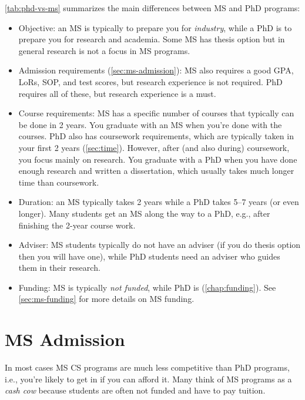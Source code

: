 \documentclass[oneside,11pt]{book}
\begin{document}
\autoref{tab:phd-vs-ms} summarizes the main differences between MS and PhD programs:
\begin{itemize}

  \item Objective: an MS is typically to prepare you for \emph{industry}, while a PhD is to prepare you for research and academia. Some MS has thesis option but in general research is not a focus in MS programs.

  \item Admission requirements (\autoref{sec:ms-admission}): MS also requires a good GPA, LoRs, SOP, and test scores, but research experience is not required.  PhD requires all of these, but research experience is a must.
  
  \item Course requirements: MS has a specific number of courses that typically can be done in 2 years. You graduate with an MS when you're done with the courses. PhD also has coursework requirements, which are typically taken in your first 2 years  (\autoref{sec:time}). However, after (and also during) coursework, you focus mainly on research.  You graduate with a PhD when you have done enough research and written a dissertation, which usually takes much longer time than coursework.
  
  \item Duration: an MS typically takes 2 years while a PhD takes 5--7 years (or even longer).  Many students get an MS along the way to a PhD, e.g., after finishing the 2-year course work.
  
  \item Adviser: MS students typically do not have an adviser (if you do thesis option then you will have one), while PhD students need an adviser who guides them in their research.
  
  \item Funding: MS is typically \emph{not funded}, while PhD is (\autoref{chap:funding}). See \autoref{sec:ms-funding} for more details on MS funding.
  
\end{itemize}

\section{MS Admission}\label{sec:ms-admission}

In most cases MS CS programs are much less competitive than PhD programs, i.e., you're likely to get in if you can afford it. Many think of MS programs as a \emph{cash cow} because students are often not funded and have to pay tuition. 
\end{document}
